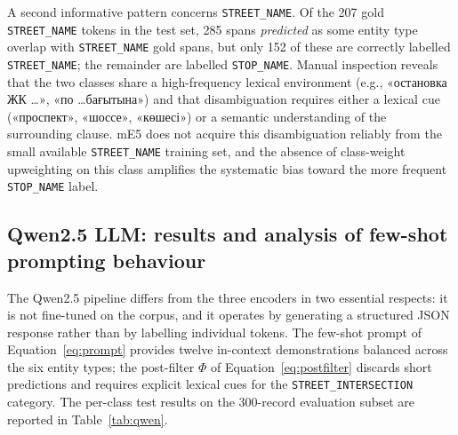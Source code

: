 A second informative pattern concerns \texttt{STREET\_NAME}. Of the 207 gold \texttt{STREET\_NAME} tokens in the test set, 285 spans \emph{predicted} as some entity type overlap with \texttt{STREET\_NAME} gold spans, but only 152 of these are correctly labelled \texttt{STREET\_NAME}; the remainder are labelled \texttt{STOP\_NAME}. Manual inspection reveals that the two classes share a high-frequency lexical environment (e.g., \foreignlanguage{russian}{«остановка ЖК \ldots»}, \foreignlanguage{russian}{«по \ldots бағытына»}) and that disambiguation requires either a lexical cue (\foreignlanguage{russian}{«проспект»}, \foreignlanguage{russian}{«шоссе»}, \foreignlanguage{russian}{«көшесі»}) or a semantic understanding of the surrounding clause. mE5 does not acquire this disambiguation reliably from the small available \texttt{STREET\_NAME} training set, and the absence of class-weight upweighting on this class amplifies the systematic bias toward the more frequent \texttt{STOP\_NAME} label.

\subsection{Qwen2.5 LLM: results and analysis of few-shot prompting behaviour}
\label{sec:qwen_results}

The Qwen2.5 pipeline differs from the three encoders in two essential respects: it is not fine-tuned on the corpus, and it operates by generating a structured JSON response rather than by labelling individual tokens. The few-shot prompt of Equation~\eqref{eq:prompt} provides twelve in-context demonstrations balanced across the six entity types; the post-filter $\Phi$ of Equation~\eqref{eq:postfilter} discards short predictions and requires explicit lexical cues for the \texttt{STREET\_INTERSECTION} category. The per-class test results on the 300-record evaluation subset are reported in Table~\ref{tab:qwen}.

